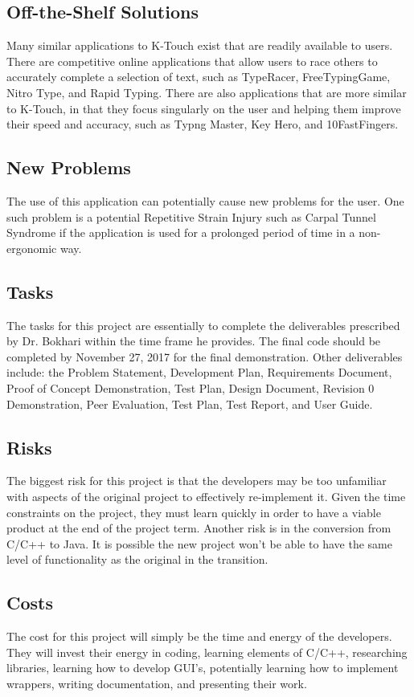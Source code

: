 \documentclass[12pt, titlepage]{article}
\begin{document}
\subsection{Off-the-Shelf Solutions}
\indent \indent Many similar applications to K-Touch exist that are readily available to users. There are competitive online applications that allow users to race others to accurately complete a selection of text, such as TypeRacer, FreeTypingGame, Nitro Type, and Rapid Typing. There are also applications that are more similar to K-Touch, in that they focus singularly on the user and helping them improve their speed and accuracy, such as Typng Master, Key Hero, and 10FastFingers.

\subsection{New Problems}
\indent \indent The use of this application can potentially cause new problems for the user. One such problem is a potential Repetitive Strain Injury such as Carpal Tunnel Syndrome if the application is used for a prolonged period of time in a non-ergonomic way. 

\subsection{Tasks}
\indent \indent The tasks for this project are essentially to complete the deliverables prescribed by Dr. Bokhari within the time frame he provides. The final code should be completed by November 27, 2017 for the final demonstration. Other deliverables include: the Problem Statement, Development Plan, Requirements Document, Proof of Concept Demonstration, Test Plan, Design Document, Revision 0 Demonstration, Peer Evaluation, Test Plan, Test Report, and User Guide.

\subsection{Risks}
\indent \indent The biggest risk for this project is that the developers may be too unfamiliar with aspects of the original project to effectively re-implement it. Given the time constraints on the project, they must learn quickly in order to have a viable product at the end of the project term. Another risk is in the conversion from C/C++ to Java. It is possible the new project won't be able to have the same level of functionality as the original in the transition.

\subsection{Costs}
\indent \indent The cost for this project will simply be the time and energy of the developers. They will invest their energy in coding, learning elements of C/C++, researching libraries, learning how to develop GUI's, potentially learning how to implement wrappers, writing documentation, and presenting their work.
\end{document}
